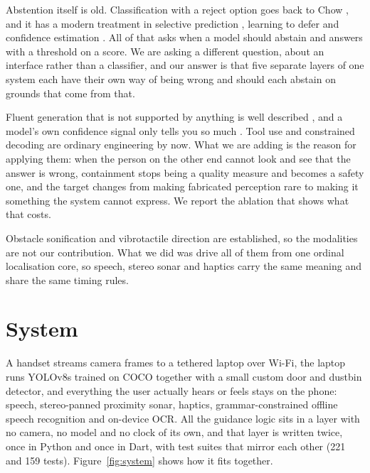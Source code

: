 \documentclass[sigconf,nonacm]{acmart}
\begin{document}
Abstention itself is old. Classification with a reject option goes back to Chow
\cite{chow1970reject}, and it has a modern treatment in selective prediction
\cite{elyaniv2010selective,geifman2017selectivenet}, learning to defer
\cite{madras2018defer,mozannar2020defer} and confidence estimation
\cite{hendrycks2017baseline,guo2017calibration}. All of that asks when a model
should abstain and answers with a threshold on a score. We are asking a
different question, about an interface rather than a classifier, and our answer
is that five separate layers of one system each have their own way of being
wrong and should each abstain on grounds that come from that.

Fluent generation that is not supported by anything is well described
\cite{ji2023hallucination,maynez2020faithfulness}, and a model's own confidence
signal only tells you so much \cite{kadavath2022know}. Tool use
\cite{schick2023toolformer,yao2023react,parisi2022talm,qin2024toolllm} and
constrained decoding \cite{scholak2021picard,willard2023guided} are ordinary
engineering by now. What we are adding is the reason for applying them: when the
person on the other end cannot look and see that the answer is wrong,
containment stops being a quality measure and becomes a safety one, and the
target changes from making fabricated perception rare to making it something the
system cannot express. We report the ablation that shows what that costs.

Obstacle sonification \cite{meijer1992voice,csapo2013auditory} and vibrotactile
direction \cite{vanerp2005waypoint} are established, so the modalities are not
our contribution. What we did was drive all of them from one ordinal
localisation core, so speech, stereo sonar and haptics carry the same meaning
and share the same timing rules.

\section{System}

A handset streams camera frames to a tethered laptop over Wi-Fi, the laptop runs
YOLOv8s \cite{redmon2016yolo,jocher2023ultralytics} trained on COCO
\cite{lin2014coco} together with a small custom door and dustbin detector, and
everything the user actually hears or feels stays on the phone: speech,
stereo-panned proximity sonar, haptics, grammar-constrained offline speech
recognition \cite{vosk,povey2011kaldi} and on-device OCR. All the guidance logic
sits in a layer with no camera, no model and no clock of its own, and that layer
is written twice, once in Python and once in Dart, with test suites that mirror
each other (221 and 159 tests). Figure~\ref{fig:system} shows how it fits
together.
\end{document}
